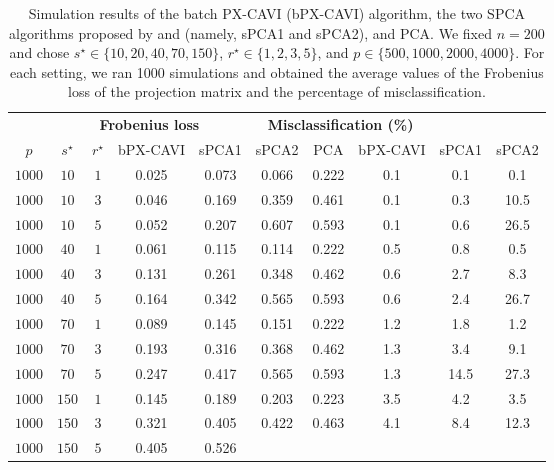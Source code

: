 \documentclass[pdftex, noinfoline, letter]{imsart}
\theoremstyle{plain}
\begin{document}
\begin{table}[h!]
\begin{adjustwidth}{-.3in}{-.3in}  
\centering
\caption{\small Simulation results of the batch PX-CAVI (bPX-CAVI) algorithm, the two SPCA algorithms proposed by \citet{zou06} and \citet{erichson20} (namely, sPCA1 and sPCA2), and PCA. We fixed $n = 200$ and chose $s^\star \in \{10, 20, 40, 70, 150\}$, $r^\star \in \{1, 2, 3, 5\}$, and $p \in \{500, 1000, 2000, 4000\}$. For each setting, we ran 1000 simulations and obtained the average values of the Frobenius loss of the projection matrix and the percentage of misclassification.}
\label{sim-3}
{ 
\small
\begin{tabular}{ccc|cccc||ccc}
\Xhline{2\arrayrulewidth}
\multicolumn{3}{c|}{ }  & \multicolumn{4}{c||}{\bf Frobenius loss} & \multicolumn{3}{c}{\bf Misclassification (\%)} 
\\\Xhline{2\arrayrulewidth}
    $p$ & $s^\star$ & $r^\star$ &  bPX-CAVI & sPCA1 & sPCA2 & PCA & bPX-CAVI & sPCA1 & sPCA2 \\
\hline
    $1000$ & $10$ & $1$  &
    0.025 & 0.073
    & 0.066 & 0.222 
    & 0.1 & 0.1 & 0.1\\
    $1000$ & $10$ & $3$ &
    0.046 & 0.169 
    & 0.359 & 0.461
    & 0.1 & 0.3 & 10.5 \\
    $1000$ & $10$ & $5$ &
    0.052& 0.207 
    & 0.607  & 0.593
    &0.1 & 0.6 & 26.5\\
    \hline
    $1000$ & $40$ & $1$  &
    0.061 & 0.115 
    & 0.114  & 0.222 
    &0.5 & 0.8 & 0.5\\
    $1000$ & $40$ & $3$ &
    0.131 & 0.261 
    & 0.348 & 0.462 
    & 0.6 & 2.7 & 8.3\\
    $1000$ & $40$ & $5$ &
    0.164 & 0.342 
    & 0.565 & 0.593
    & 0.6 & 2.4 & 26.7\\
    \hline
    $1000$ & $70$ & $1$  &
    0.089 & 0.145 
    & 0.151  & 0.222 
    & 1.2 & 1.8 & 1.2\\
    $1000$ & $70$ & $3$ &
    0.193 & 0.316 
    & 0.368  & 0.462
    & 1.3 & 3.4 & 9.1 \\
    $1000$ & $70$ & $5$ &
    0.247 & 0.417 
    & 0.565  & 0.593 
    & 1.3 & 14.5 & 27.3\\   
    \hline
    $1000$ & $150$ & $1$  &
    0.145 & 0.189 
    & 0.203 & 0.223  
    & 3.5 & 4.2 & 3.5\\
    $1000$ & $150$ & $3$ &
    0.321 & 0.405 
    & 0.422  & 0.463 
    & 4.1 & 8.4 & 12.3 \\
    $1000$ & $150$ & $5$ &
    0.405  & 0.526 

\end{tabular}}
\end{adjustwidth}
\end{table}
\end{document}

